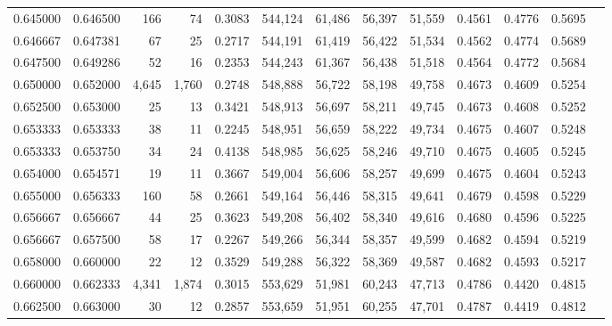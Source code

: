 \begin{tabular}{rrrrrrrrrrrrr}
0.645000 & 0.646500 &    166 &    74 &                                     0.3083 & 544,124 &  61,486 &  56,397 &  51,559 & 0.4561 & 0.4776 & 0.5695 \\
0.646667 & 0.647381 &     67 &    25 &                                     0.2717 & 544,191 &  61,419 &  56,422 &  51,534 & 0.4562 & 0.4774 & 0.5689 \\
0.647500 & 0.649286 &     52 &    16 &                                     0.2353 & 544,243 &  61,367 &  56,438 &  51,518 & 0.4564 & 0.4772 & 0.5684 \\
0.650000 & 0.652000 &  4,645 & 1,760 &                                     0.2748 & 548,888 &  56,722 &  58,198 &  49,758 & 0.4673 & 0.4609 & 0.5254 \\
0.652500 & 0.653000 &     25 &    13 &                                     0.3421 & 548,913 &  56,697 &  58,211 &  49,745 & 0.4673 & 0.4608 & 0.5252 \\
0.653333 & 0.653333 &     38 &    11 &                                     0.2245 & 548,951 &  56,659 &  58,222 &  49,734 & 0.4675 & 0.4607 & 0.5248 \\
0.653333 & 0.653750 &     34 &    24 &                                     0.4138 & 548,985 &  56,625 &  58,246 &  49,710 & 0.4675 & 0.4605 & 0.5245 \\
0.654000 & 0.654571 &     19 &    11 &                                     0.3667 & 549,004 &  56,606 &  58,257 &  49,699 & 0.4675 & 0.4604 & 0.5243 \\
0.655000 & 0.656333 &    160 &    58 &                                     0.2661 & 549,164 &  56,446 &  58,315 &  49,641 & 0.4679 & 0.4598 & 0.5229 \\
0.656667 & 0.656667 &     44 &    25 &                                     0.3623 & 549,208 &  56,402 &  58,340 &  49,616 & 0.4680 & 0.4596 & 0.5225 \\
0.656667 & 0.657500 &     58 &    17 &                                     0.2267 & 549,266 &  56,344 &  58,357 &  49,599 & 0.4682 & 0.4594 & 0.5219 \\
0.658000 & 0.660000 &     22 &    12 &                                     0.3529 & 549,288 &  56,322 &  58,369 &  49,587 & 0.4682 & 0.4593 & 0.5217 \\
0.660000 & 0.662333 &  4,341 & 1,874 &                                     0.3015 & 553,629 &  51,981 &  60,243 &  47,713 & 0.4786 & 0.4420 & 0.4815 \\
0.662500 & 0.663000 &     30 &    12 &                                     0.2857 & 553,659 &  51,951 &  60,255 &  47,701 & 0.4787 & 0.4419 & 0.4812 \\

\end{tabular}
